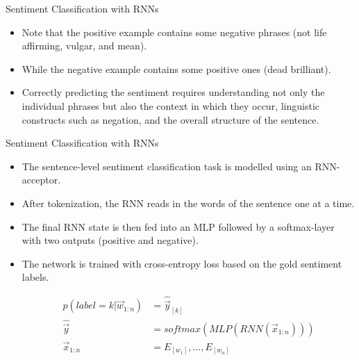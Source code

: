 \documentclass[handout]{beamer}
\begin{document}
\begin{frame}{Sentiment Classification with RNNs}
\begin{scriptsize}
\begin{itemize}
\item Note that the positive example contains some negative phrases (not life affirming, vulgar, and mean).
\item While the negative example contains some positive ones (dead brilliant).
\item Correctly predicting the sentiment requires understanding not only the individual phrases but also the context in which they occur, linguistic constructs such as negation, and the overall structure of the sentence.
\end{itemize}
\end{scriptsize}
\end{frame}

\begin{frame}{Sentiment Classification with RNNs}
\begin{scriptsize}
\begin{itemize}
\item The sentence-level sentiment classification task is modelled using an RNN-acceptor.
\item After tokenization, the RNN reads in the words of the sentence one at a time. \item The final RNN state is then fed into an MLP followed by a softmax-layer with two outputs (positive and negative). 
\item The network is trained with cross-entropy loss based on the gold sentiment labels.

\begin{equation}
\begin{split}
p(label = k | \vec{w}_{1:n}) & = \hat{\vec{y}}_{[k]} \\
\hat{\vec{y}} & = softmax(MLP(RNN(\vec{x}_{1:n}))) \\
\vec{x}_{1:n} & = E_{[w_{1}]}, \dots, E_{[w_{n}]} 
\end{split}
\end{equation}

\end{itemize}
\end{scriptsize}
\end{frame}
\end{document}
